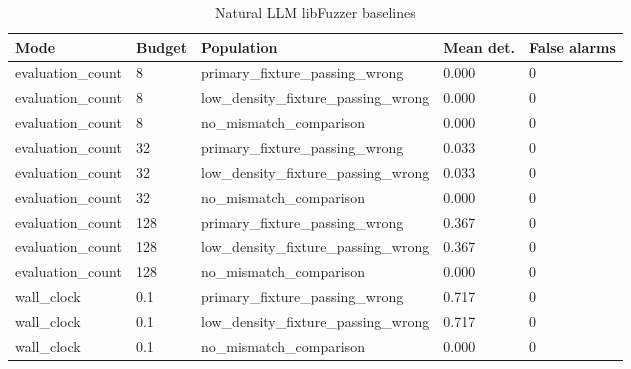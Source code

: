 \begin{table}[t]
\centering
\small
\caption{Natural LLM libFuzzer baselines}
\begin{tabular}{lllll}
\toprule
Mode & Budget & Population & Mean det. & False alarms \\
\midrule
evaluation\_count & 8 & primary\_fixture\_passing\_wrong & 0.000 & 0 \\
evaluation\_count & 8 & low\_density\_fixture\_passing\_wrong & 0.000 & 0 \\
evaluation\_count & 8 & no\_mismatch\_comparison & 0.000 & 0 \\
evaluation\_count & 32 & primary\_fixture\_passing\_wrong & 0.033 & 0 \\
evaluation\_count & 32 & low\_density\_fixture\_passing\_wrong & 0.033 & 0 \\
evaluation\_count & 32 & no\_mismatch\_comparison & 0.000 & 0 \\
evaluation\_count & 128 & primary\_fixture\_passing\_wrong & 0.367 & 0 \\
evaluation\_count & 128 & low\_density\_fixture\_passing\_wrong & 0.367 & 0 \\
evaluation\_count & 128 & no\_mismatch\_comparison & 0.000 & 0 \\
wall\_clock & 0.1 & primary\_fixture\_passing\_wrong & 0.717 & 0 \\
wall\_clock & 0.1 & low\_density\_fixture\_passing\_wrong & 0.717 & 0 \\
wall\_clock & 0.1 & no\_mismatch\_comparison & 0.000 & 0 \\
\bottomrule
\end{tabular}
\end{table}
